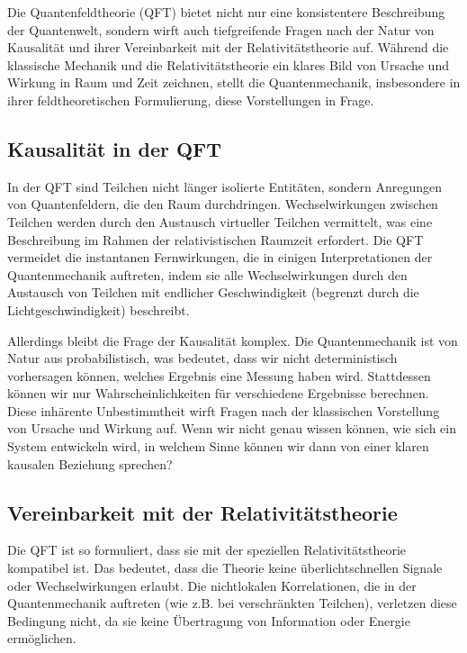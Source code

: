 \documentclass{article}
\begin{document}
	Die Quantenfeldtheorie (QFT) bietet nicht nur eine konsistentere Beschreibung der Quantenwelt, sondern wirft auch tiefgreifende Fragen nach der Natur von Kausalität und ihrer Vereinbarkeit mit der Relativitätstheorie auf.  Während die klassische Mechanik und die Relativitätstheorie ein klares Bild von Ursache und Wirkung in Raum und Zeit zeichnen, stellt die Quantenmechanik, insbesondere in ihrer feldtheoretischen Formulierung, diese Vorstellungen in Frage.
	
	\subsection{Kausalität in der QFT}
	
	In der QFT sind Teilchen nicht länger isolierte Entitäten, sondern Anregungen von Quantenfeldern, die den Raum durchdringen. Wechselwirkungen zwischen Teilchen werden durch den Austausch virtueller Teilchen vermittelt, was eine Beschreibung im Rahmen der relativistischen Raumzeit erfordert.  Die QFT vermeidet die instantanen Fernwirkungen, die in einigen Interpretationen der Quantenmechanik auftreten, indem sie alle Wechselwirkungen durch den Austausch von Teilchen mit endlicher Geschwindigkeit (begrenzt durch die Lichtgeschwindigkeit) beschreibt.
	
	Allerdings bleibt die Frage der Kausalität komplex.  Die Quantenmechanik ist von Natur aus probabilistisch, was bedeutet, dass wir nicht deterministisch vorhersagen können, welches Ergebnis eine Messung haben wird.  Stattdessen können wir nur Wahrscheinlichkeiten für verschiedene Ergebnisse berechnen.  Diese inhärente Unbestimmtheit wirft Fragen nach der klassischen Vorstellung von Ursache und Wirkung auf.  Wenn wir nicht genau wissen können, wie sich ein System entwickeln wird, in welchem Sinne können wir dann von einer klaren kausalen Beziehung sprechen?
	
	\subsection{Vereinbarkeit mit der Relativitätstheorie}
	
	Die QFT ist so formuliert, dass sie mit der speziellen Relativitätstheorie kompatibel ist.  Das bedeutet, dass die Theorie keine überlichtschnellen Signale oder Wechselwirkungen erlaubt.  Die nichtlokalen Korrelationen, die in der Quantenmechanik auftreten (wie z.B. bei verschränkten Teilchen), verletzen diese Bedingung nicht, da sie keine Übertragung von Information oder Energie ermöglichen.
	
\end{document}
